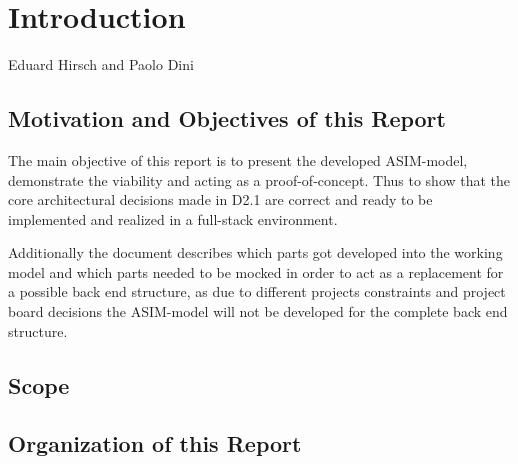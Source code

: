 \chapter{Introduction}
\label{ch:Introduction}

\vspace{-1cm}
\begin{center}
Eduard Hirsch and Paolo Dini
\end{center}


\section{Motivation and Objectives of this Report}

The main objective of this report is to present the developed ASIM-model,
demonstrate the viability and acting as a proof-of-concept. Thus to show
that the core architectural decisions made in D2.1 are correct and ready to be
implemented and realized in a full-stack environment.

Additionally the document describes which parts got developed into
the working model and which parts needed to be mocked in order to act as
a replacement for a possible back end structure, as due to different
projects constraints and project board decisions the ASIM-model will
not be developed for the complete back end structure.

\section{Scope}


\section{Organization of this Report}


\newpage











